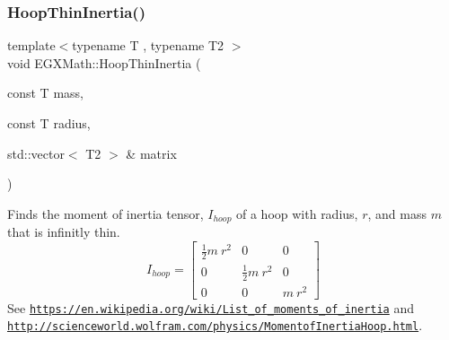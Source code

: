 \subsubsection{\texorpdfstring{Hoop\+Thin\+Inertia()}{HoopThinInertia()}\hspace{0.1cm}{\footnotesize\ttfamily [2/3]}}
{\footnotesize\ttfamily template$<$typename T , typename T2 $>$ \\
void E\+G\+X\+Math\+::\+Hoop\+Thin\+Inertia (\begin{DoxyParamCaption}\item[{const T}]{mass,  }\item[{const T}]{radius,  }\item[{std\+::vector$<$ T2 $>$ \&}]{matrix }\end{DoxyParamCaption})}



Finds the moment of inertia tensor, $I_{hoop}$ of a hoop with radius, $r$, and mass $m$ that is infinitly thin. \[ I_{hoop}=\begin{bmatrix} \frac{1}{2}m\ r^2 & 0 & 0\\ 0 & \frac{1}{2}m\ r^2 & 0\\ 0 & 0 & m\ r^2 \end{bmatrix} \] See \href{https://en.wikipedia.org/wiki/List_of_moments_of_inertia}{\tt https\+://en.\+wikipedia.\+org/wiki/\+List\+\_\+of\+\_\+moments\+\_\+of\+\_\+inertia} and \href{http://scienceworld.wolfram.com/physics/MomentofInertiaHoop.html}{\tt http\+://scienceworld.\+wolfram.\+com/physics/\+Momentof\+Inertia\+Hoop.\+html}. 


